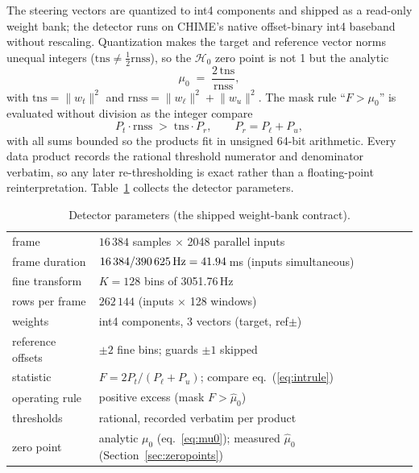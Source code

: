 The steering vectors are quantized to int4 components and shipped as a
read-only weight bank; the detector runs on CHIME's native offset-binary
int4 baseband without rescaling. Quantization makes the target and
reference vector norms unequal integers ($\mathrm{tns} \ne
\tfrac{1}{2}\mathrm{rnss}$), so the $\mathcal{H}_0$ zero point is not 1
but the analytic
\begin{equation}
  \mu_0 \;=\; \frac{2\,\mathrm{tns}}{\mathrm{rnss}},
  \label{eq:mu0}
\end{equation}
with $\mathrm{tns} = \lVert w_t \rVert^2$ and $\mathrm{rnss} =
\lVert w_\ell \rVert^2 + \lVert w_u \rVert^2$. The mask rule ``$F > \mu_0$''
is evaluated without division as the integer compare
\begin{equation}
  P_t \cdot \mathrm{rnss} \;>\; \mathrm{tns} \cdot P_r,
  \qquad P_r = P_\ell + P_u,
  \label{eq:intrule}
\end{equation}
with all sums bounded so the products fit in unsigned 64-bit arithmetic.
Every data product records the rational threshold numerator and denominator
verbatim, so any later re-thresholding is exact rather than a floating-point
reinterpretation. Table~\ref{tab:params} collects the detector parameters.

\begin{table}
  \centering
  \caption{Detector parameters (the shipped weight-bank contract).}
  \label{tab:params}
  \begin{tabular}{ll}
    \toprule
    frame & $16\,384$ samples $\times$ 2048 parallel inputs \\
    frame duration & $16\,384/390\,625\,{\rm Hz} = 41.94$\,ms
                     (inputs simultaneous) \\
    fine transform & $K = 128$ bins of 3051.76\,Hz \\
    rows per frame & $262\,144$ (inputs $\times$ 128 windows) \\
    weights & int4 components, 3 vectors (target, ref$\pm$) \\
    reference offsets & $\pm 2$ fine bins; guards $\pm 1$ skipped \\
    statistic & $F = 2P_t/(P_\ell + P_u)$; compare eq.~(\ref{eq:intrule}) \\
    operating rule & positive excess (mask $F > \hat\mu_0$) \\
    thresholds & rational, recorded verbatim per product \\
    zero point & analytic $\mu_0$ (eq.~\ref{eq:mu0}); measured
                 $\hat\mu_0$ (Section~\ref{sec:zeropoints}) \\
    \bottomrule
  \end{tabular}
\end{table}

